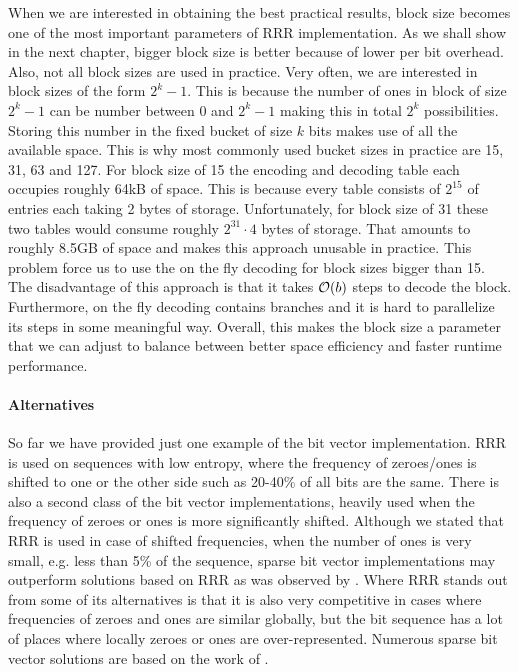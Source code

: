 When we are interested in obtaining the best practical results, block size becomes
one of the most important parameters of RRR implementation. As we shall show in the next
chapter, bigger block size is better because of lower per bit overhead. Also, not all block
sizes are used in practice. Very often, we are interested in block sizes of the form $2^k-1$.
This is because the number of ones in block of size $2^k-1$ can be number between 0 and $2^k-1$
making this in total $2^k$ possibilities. Storing this number in the fixed bucket of size
$k$ bits makes use of all the available space. This is why most commonly used bucket sizes in
practice are 15, 31, 63 and 127. For block size of 15 the encoding and decoding table
each occupies roughly 64kB of space. This is because every table consists of $2^{15}$ of entries
each taking 2 bytes of storage. Unfortunately, for block size of 31 these two tables would consume
roughly $2^{31}\cdot 4$ bytes of storage. That amounts to roughly 8.5GB of space and makes this approach
unusable in practice. This problem force us to use the on the fly decoding for block sizes
bigger than 15. The disadvantage of this approach is that it takes $\mathcal{O}(b)$ steps to decode the block.
Furthermore, on the fly decoding contains branches and it is hard to parallelize its steps in some meaningful
way. Overall, this makes the block size a parameter that we can adjust to balance between better space
efficiency and faster runtime performance.

\paragraph{Alternatives}

So far we have provided just one example of the bit vector implementation.
RRR is used on sequences with low entropy, where the frequency of zeroes/ones
is shifted to one or the other side such as 20-40\% of all bits are the same.
There is also a second class of the bit vector implementations, heavily
used when the frequency of zeroes or ones is more significantly shifted.
Although we stated that RRR is used in case of shifted frequencies, when the number
of ones is very small, e.g. less than 5\% of the sequence, sparse bit vector
implementations may outperform solutions based on RRR as was observed by \cite{navarro2012fast}.
Where RRR stands out from some of its alternatives is that it is also very competitive
in cases where frequencies of zeroes and ones are similar globally, but the bit
sequence has a lot of places where locally zeroes or ones are over-represented.
Numerous sparse bit vector solutions are based on the work of \cite{okanohara2007practical}.
